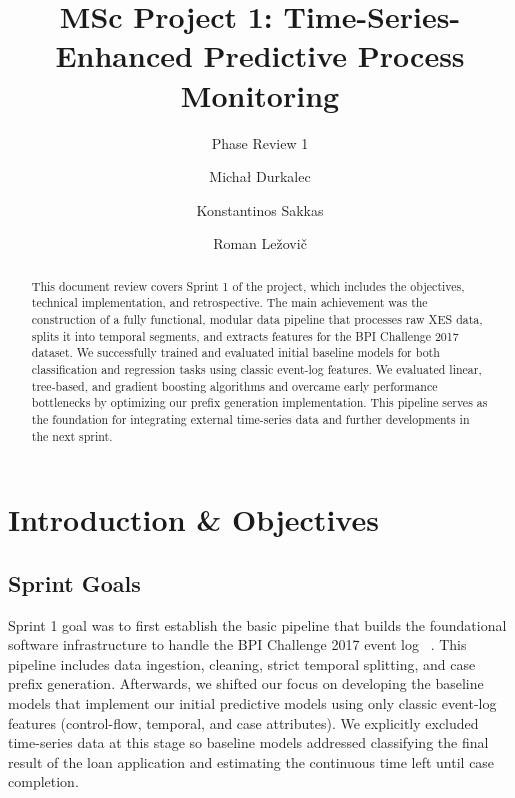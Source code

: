 \documentclass[runningheads]{llncs}
\begin{document}
%
\title{MSc Project 1: Time-Series-Enhanced Predictive Process Monitoring}
\subtitle{Phase Review 1}
%
%
\author{Michał Durkalec \and
    Konstantinos Sakkas \and
    Roman Ležovič
}
%
%
%
\maketitle  %
%
\begin{abstract}

    This document review covers Sprint 1 of the project, which includes the objectives, technical implementation, and retrospective. The main achievement  was the construction of a fully functional, modular data pipeline that processes raw XES data, splits it into temporal segments, and extracts features for the BPI Challenge 2017 dataset. We successfully trained and evaluated initial baseline models for both classification and regression tasks using classic event-log features. We evaluated linear, tree-based, and gradient boosting algorithms and overcame early performance bottlenecks by optimizing our prefix generation implementation. This pipeline serves as the foundation for integrating external time-series data and further developments in the next sprint.

\end{abstract}
%
%
%
\section{Introduction \& Objectives}

\subsection{Sprint Goals}
Sprint 1  goal was to first establish the basic pipeline that builds the foundational software infrastructure to handle the BPI Challenge 2017 event log ~\cite{bpic2017}. This pipeline includes data ingestion, cleaning, strict temporal splitting, and case prefix generation. Afterwards, we shifted our focus on developing the baseline models that implement our initial predictive models using only classic event-log features (control-flow, temporal, and case attributes). We explicitly excluded time-series data at this stage so baseline models addressed classifying the final result of the loan application and estimating the continuous time left until case completion.
\end{document}
